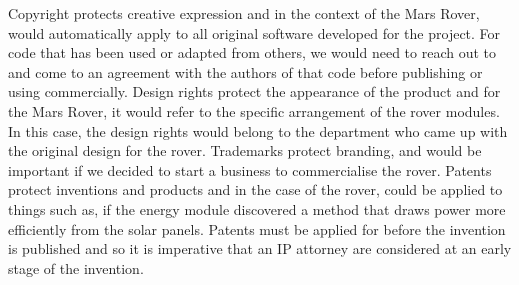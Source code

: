 \documentclass[10pt,twoside]{article}
\begin{document}
Copyright protects creative expression and in the context of the Mars Rover, would automatically apply to all original software developed for the project. For code that has been used or adapted from others, we would need to reach out to and come to an agreement with the authors of that code before publishing or using commercially. Design rights protect the appearance of the product and for the Mars Rover, it would refer to the specific arrangement of the rover modules. In this case, the design rights would belong to the department who came up with the original design for the rover. Trademarks protect branding, and would be important if we decided to start a business to commercialise the rover. Patents protect inventions and products and in the case of the rover, could be applied to things such as, if the energy module discovered a method that draws power more efficiently from the solar panels. Patents must be applied for before the invention is published and so it is imperative that an IP attorney are considered at an early stage of the invention. 
\end{document}
